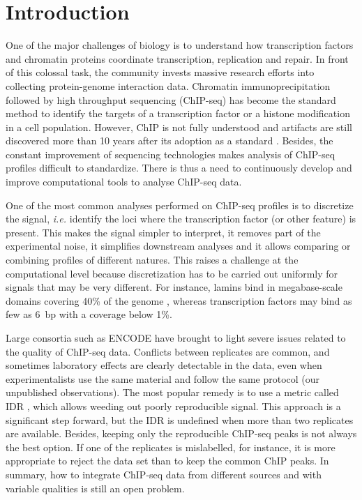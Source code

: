 \documentclass{bioinfo}
\begin{document}
\section{Introduction}
One of the major challenges of biology is to understand how
transcription factors and chromatin proteins coordinate transcription,
replication and repair. In front of this colossal task, the community
invests massive research efforts into collecting protein-genome
interaction data. Chromatin immunoprecipitation followed by high
throughput sequencing (ChIP-seq) has become the standard method to
identify the targets of a transcription factor or a histone
modification in a cell population. However, ChIP is not fully
understood and artifacts are still discovered more than 10 years
after its adoption as a standard \citep{pmid24349523, pmid24173036}.
Besides, the constant improvement of sequencing technologies makes
analysis of ChIP-seq profiles difficult to standardize. There is thus
a need to continuously develop and improve computational tools to
analyse ChIP-seq data.

One of the most common analyses performed on ChIP-seq profiles is to
discretize the signal, \textit{i.e.} identify the loci where the
transcription factor (or other feature) is present.
This makes the signal simpler to interpret,
it removes part of the experimental noise, it simplifies
downstream analyses and it allows comparing or combining profiles of
different natures. This raises a challenge at the computational level
because discretization has to be carried out uniformly for signals
that may be very different. For instance, lamins bind in
megabase-scale domains covering 40\% of the genome
\citep{pmid18463634}, whereas transcription factors may bind as few
as 6~bp with a coverage below 1\%.

Large consortia such as ENCODE have brought to light
severe issues related to the quality of ChIP-seq data.
Conflicts between replicates are common, and
sometimes laboratory effects are clearly detectable in the data,
even when experimentalists use the same material and follow the same
protocol (our unpublished observations). The most popular remedy is to
use a metric called IDR \citep[Irreproducible Discovery Rate,][]{li2011},
which allows weeding
out poorly reproducible signal. This approach is a significant step
forward, but the IDR is undefined when more than two replicates are
available. Besides, keeping only the reproducible ChIP-seq peaks is not
always the best option. If one of the replicates is mislabelled,
for instance, it is more appropriate to reject the data set than to keep
the common ChIP peaks. In summary, how to integrate ChIP-seq data
from different sources and with variable qualities is still an open
problem.
\end{document}
